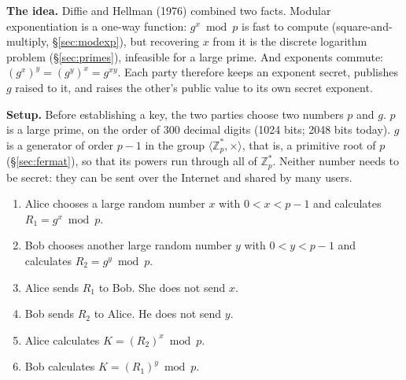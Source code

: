 \textbf{The idea.} Diffie and Hellman (1976) combined two facts. Modular exponentiation is a one-way function: $g^x \bmod p$ is fast to compute (square-and-multiply, \S\ref{sec:modexp}), but recovering $x$ from it is the discrete logarithm problem (\S\ref{sec:primes}), infeasible for a large prime. And exponents commute: $(g^x)^y = (g^y)^x = g^{xy}$. Each party therefore keeps an exponent secret, publishes $g$ raised to it, and raises the other's public value to its own secret exponent.

\textbf{Setup.} Before establishing a key, the two parties choose two numbers $p$ and $g$. $p$ is a large prime, on the order of 300 decimal digits (1024 bits; 2048 bits today). $g$ is a generator of order $p - 1$ in the group $\langle \mathbb{Z}_p^*, \times \rangle$, that is, a primitive root of $p$ (\S\ref{sec:fermat}), so that its powers run through all of $\mathbb{Z}_p^*$. Neither number needs to be secret: they can be sent over the Internet and shared by many users.
\begin{enumerate}
  \item Alice chooses a large random number $x$ with $0 < x < p - 1$ and calculates $R_1 = g^x \bmod p$.
  \item Bob chooses another large random number $y$ with $0 < y < p - 1$ and calculates $R_2 = g^y \bmod p$.
  \item Alice sends $R_1$ to Bob. She does not send $x$.
  \item Bob sends $R_2$ to Alice. He does not send $y$.
  \item Alice calculates $K = (R_2)^x \bmod p$.
  \item Bob calculates $K = (R_1)^y \bmod p$.
\end{enumerate}
\begin{center}
\end{center}

